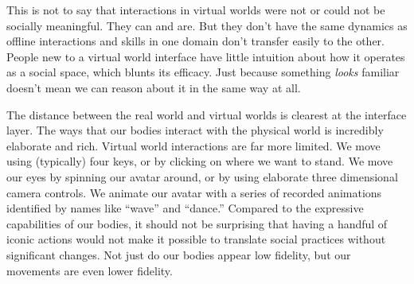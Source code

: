 This is not to say that interactions in virtual worlds were not or could not be socially meaningful. They can and are. But they don't have the same dynamics as offline interactions and skills in one domain don't transfer easily to the other. People new to a virtual world interface have little intuition about how it operates as a social space, which blunts its efficacy. Just because something \emph{looks} familiar doesn't mean we can reason about it in the same way at all.

The distance between the real world and virtual worlds is clearest at the interface layer. The ways that our bodies interact with the physical world is incredibly elaborate and rich. Virtual world interactions are far more limited. We move using (typically) four keys, or by clicking on where we want to stand. We move our eyes by spinning our avatar around, or by using elaborate three dimensional camera controls. We animate our avatar with a series of recorded animations identified by names like ``wave'' and ``dance.'' Compared to the expressive capabilities of our bodies, it should not be surprising that having a handful of iconic actions would not make it possible to translate social practices without significant changes. Not just do our bodies appear low fidelity, but our movements are even lower fidelity. 

